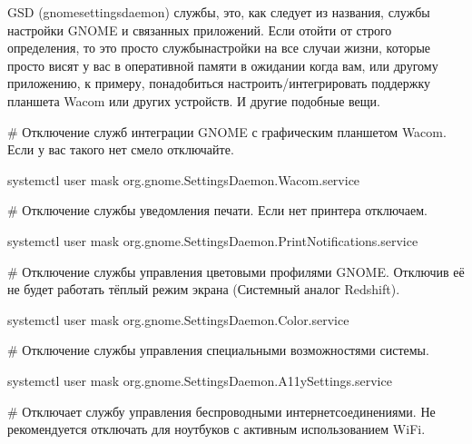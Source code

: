 \documentclass[letterpaper,10pt,russian,openany]{sphinxmanual}
\begin{document}
\sphinxAtStartPar
GSD (gnome\sphinxhyphen{}settings\sphinxhyphen{}daemon) службы, это, как следует из названия, службы настройки GNOME и связанных приложений.
Если отойти от строго определения, то это просто службы\sphinxhyphen{}настройки на все случаи жизни,
которые просто висят у вас в оперативной памяти в ожидании когда вам, или другому приложению, к примеру,
понадобиться настроить/интегрировать поддержку планшета Wacom или других устройств. И другие подобные вещи.

\sphinxAtStartPar
\# Отключение служб интеграции GNOME с графическим планшетом Wacom.
Если у вас такого нет \sphinxhyphen{} смело отключайте.

\begin{sphinxVerbatim}[commandchars=\\\{\}]
systemctl \PYGZhy{}\PYGZhy{}user mask org.gnome.SettingsDaemon.Wacom.service
\end{sphinxVerbatim}

\sphinxAtStartPar
\# Отключение службы уведомления печати.
Если нет принтера \sphinxhyphen{} отключаем.

\begin{sphinxVerbatim}[commandchars=\\\{\}]
systemctl \PYGZhy{}\PYGZhy{}user mask org.gnome.SettingsDaemon.PrintNotifications.service
\end{sphinxVerbatim}

\sphinxAtStartPar
\# Отключение службы управления цветовыми профилями GNOME.
Отключив её не будет работать тёплый режим экрана (Системный аналог Redshift).

\begin{sphinxVerbatim}[commandchars=\\\{\}]
systemctl \PYGZhy{}\PYGZhy{}user mask org.gnome.SettingsDaemon.Color.service
\end{sphinxVerbatim}

\sphinxAtStartPar
\# Отключение службы управления специальными возможностями системы.

\begin{sphinxVerbatim}[commandchars=\\\{\}]
systemctl \PYGZhy{}\PYGZhy{}user mask org.gnome.SettingsDaemon.A11ySettings.service
\end{sphinxVerbatim}

\sphinxAtStartPar
\# Отключает службу управления беспроводными интернет\sphinxhyphen{}соединениями.
Не рекомендуется отключать для ноутбуков с активным использованием Wi\sphinxhyphen{}Fi.
\end{document}
